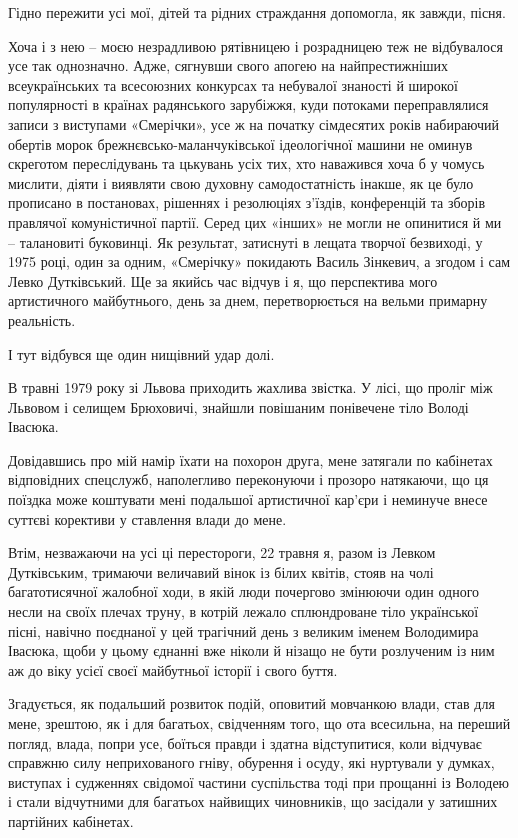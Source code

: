 Гідно пережити усі мої, дітей та рідних страждання допомогла, як завжди, пісня. 

Хоча і з нею – моєю незрадливою рятівницею і розрадницею теж не відбувалося усе
так однозначно. Адже, сягнувши свого апогею на найпрестижніших всеукраїнських
та всесоюзних конкурсах та небувалої знаності й широкої популярності в країнах
радянського зарубіжжя, куди  потоками переправлялися записи з виступами
«Смерічки», усе ж на початку сімдесятих років набираючий обертів морок
брежнєвсько-маланчуківської ідеологічної машини не оминув скреготом
переслідувань та цькувань усіх тих, хто наважився хоча б у чомусь мислити,
діяти і виявляти свою духовну самодостатність інакше, як це було прописано в
постановах, рішеннях і резолюціях з’їздів, конференцій та зборів правлячої
комуністичної партії. Серед цих «інших» не могли не опинитися й ми – талановиті
буковинці. Як результат, затиснуті в лещата творчої безвиході, у 1975 році,
один за одним, «Смерічку» покидають Василь Зінкевич, а згодом і сам Левко
Дутківський. Ще за якийсь час відчув і я, що перспектива мого артистичного
майбутнього, день за днем, перетворюється на вельми примарну реальність. 

І тут відбувся ще один нищівний удар долі. 

В травні 1979 року зі Львова приходить жахлива звістка. У лісі, що проліг між
Львовом і селищем Брюховичі, знайшли повішаним понівечене тіло Володі Івасюка. 

Довідавшись про мій намір їхати на похорон друга, мене затягали по кабінетах
відповідних спецслужб, наполегливо переконуючи і прозоро натякаючи, що ця
поїздка може коштувати мені подальшої артистичної кар’єри і неминуче внесе
суттєві корективи у ставлення влади до мене.

Втім, незважаючи на усі ці перестороги, 22 травня я, разом із Левком
Дутківським, тримаючи величавий вінок із білих квітів, стояв на чолі
багатотисячної жалобної ходи, в якій люди почергово змінюючи один одного несли
на своїх плечах труну, в котрій лежало сплюндроване тіло української пісні,
навічно поєднаної у цей трагічний день з великим іменем Володимира Івасюка,
щоби у цьому єднанні вже ніколи й нізащо не бути розлученим із ним аж до віку
усієї своєї майбутньої історії і свого буття. 

Згадується, як подальший розвиток подій, оповитий мовчанкою влади, став для
мене, зрештою, як і для багатьох, свідченням того, що ота  всесильна, на
переший погляд, влада, попри усе, боїться правди і здатна відступитися, коли
відчуває справжню силу неприхованого гніву, обурення і осуду, які нуртували у
думках, виступах і судженнях свідомої частини суспільства тоді при прощанні із
Володею і стали  відчутними для багатьох  найвищих чиновників, що засідали у
затишних партійних кабінетах.

